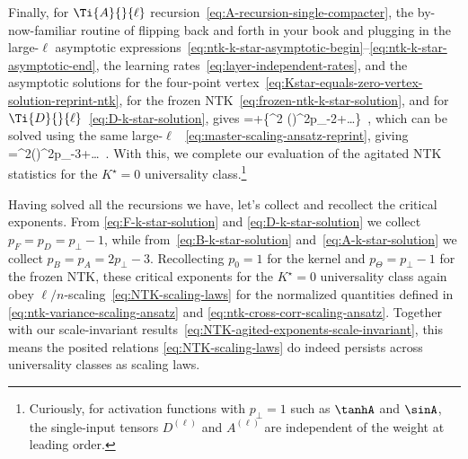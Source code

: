 Finally, for $\Ti{A}{}{\ell}$ recursion~\eqref{eq:A-recursion-single-compacter}, the by-now-familiar routine of flipping 
back and forth in your book and plugging in the large-$\ell$ asymptotic expressions~\eqref{eq:ntk-k-star-asymptotic-begin}--\eqref{eq:ntk-k-star-asymptotic-end}, the learning rates~\eqref{eq:layer-independent-rates}, and  the asymptotic solutions for the four-point vertex~\eqref{eq:Kstar-equals-zero-vertex-solution-reprint-ntk}, for the frozen NTK~\eqref{eq:frozen-ntk-k-star-solution}, and for $\Ti{D}{}{\ell}$~\eqref{eq:D-k-star-solution}, gives
\be
{}=+\le\{^2 \le(\ri)^{2p_{\perp}-2}+\ldots\ri\}\, ,
\ee
which can be solved using the same large-$\ell$ ~\eqref{eq:master-scaling-ansatz-reprint}, giving
\be\label{eq:A-k-star-solution}
=^2\le(\ri)^{2p_{\perp}-3}+\ldots\, .
\ee
With this, we complete our evaluation of the agitated NTK statistics for the $K^\star=0$ universality class.\footnote{Curiously, for activation functions with $p_\perp=1$ such as $\tanhA$ and $\sinA$, the single-input tensors $D^{(\ell)}$ and $A^{(\ell)}$ are independent of the weight  at leading order.
}

Having solved all the recursions we have, let's collect and recollect the critical exponents. From \eqref{eq:F-k-star-solution} and \eqref{eq:D-k-star-solution} we collect $p_F=p_D=p_{\perp}-1$, while from~\eqref{eq:B-k-star-solution} and~\eqref{eq:A-k-star-solution} we collect $p_B=p_A=2p_{\perp}-3$. Recollecting $p_0=1$ for the kernel and $p_{\Theta}=p_{\perp}-1$ for the frozen NTK, these critical exponents for the $K^\star=0$ universality class again obey $\ell/n$-scaling~\eqref{eq:NTK-scaling-laws} for the normalized quantities
defined in \eqref{eq:ntk-variance-scaling-ansatz} and \eqref{eq:ntk-cross-corr-scaling-ansatz}.
Together with our scale-invariant results~\eqref{eq:NTK-agited-exponents-scale-invariant}, this means the posited relations \eqref{eq:NTK-scaling-laws} do indeed persists across universality classes as scaling laws.

